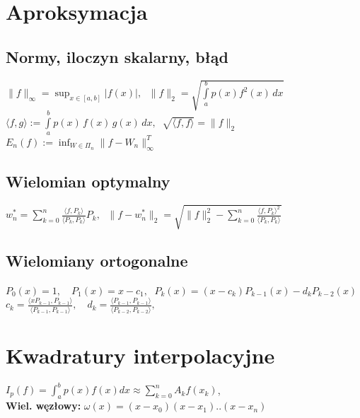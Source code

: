 \documentclass[a4paper,twocolumn]{article}
\begin{document}
\section{Aproksymacja}

\subsection{Normy, iloczyn skalarny, błąd}
$\|f\|_\infty = \sup_{x \in [a,b]}|f(x)|,\;$
$\|f\|_2 = \sqrt{\int\limits_a^b p(x)f^2(x)\,dx}$\\
$\langle f, g \rangle := \int\limits_a^b p(x)\,f(x)\,g(x)\,dx,\;\; \sqrt{\langle f, f \rangle} = \|f\|_2$\\
$E_n(f) := \inf_{W \in \Pi_n} \|f-W_n\|_\infty^T$

\subsection{Wielomian optymalny}

$w_n^* = \sum_{k=0}^n \frac{\langle f, P_k \rangle}{\langle P_k, P_k \rangle} P_k,\;$
$\|f-w_n^*\|_2 = \sqrt{\|f\|_2^2 - \sum_{k=0}^n \frac{{\langle f, P_k \rangle}^2}{\langle P_k, P_k \rangle}}$

\subsection{Wielomiany ortogonalne}

$P_0(x) = 1, \quad P_1(x) = x-c_1,\;$
 $   P_k(x) = (x-c_k)P_{k-1}(x) - d_k P_{k-2}(x) $\\
$
    c_k = \frac{\langle x P_{k-1}, P_{k-1} \rangle}{\langle P_{k-1}, P_{k-1} \rangle}, \quad
    d_k = \frac{\langle P_{k-1}, P_{k-1} \rangle}{\langle P_{k-2}, P_{k-2} \rangle},
$

\section{Kwadratury interpolacyjne}
\noindent $I_p(f) = \int_{a}^{b}p(x)f(x)dx \approx \sum_{k=0}^{n}A_kf(x_k)$, \\
\textbf{Wiel. węzłowy:} $\omega(x) = (x-x_0)(x-x_1)..(x-x_n)$
\end{document}

